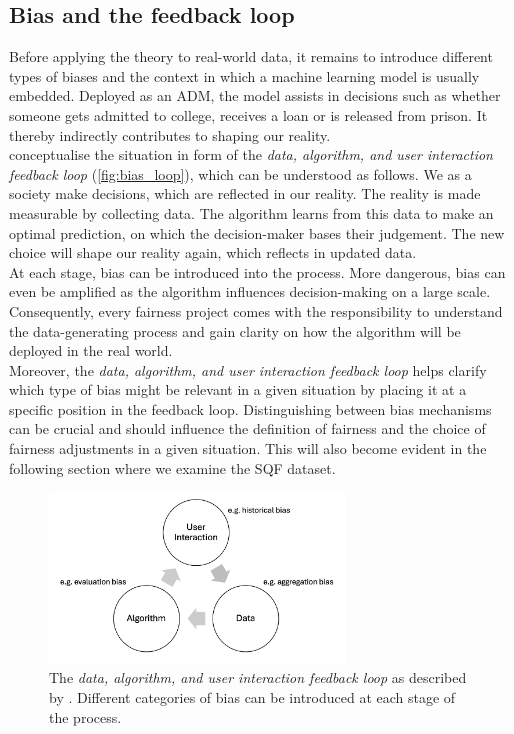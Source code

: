 \subsection{Bias and the feedback loop}
Before applying the theory to real-world data, it remains to introduce different types of biases and the context in which a machine learning model is usually embedded.
Deployed as an ADM, the model assists in decisions such as whether someone gets admitted to college, receives a loan or is released from prison. It thereby indirectly contributes to shaping our reality.\\
\cite{mehrabi2022} conceptualise the situation in form of the \textit{data, algorithm, and user interaction feedback loop} (\autoref{fig:bias_loop}), which can be understood as follows.
We as a society make decisions, which are reflected in our reality. The reality is made measurable by collecting data. The algorithm learns from this data to make an optimal prediction, on which the decision-maker bases their judgement. The new choice will shape our reality again, which reflects in updated data.\\ 
At each stage, bias can be introduced into the process. More dangerous, bias can even be amplified as the algorithm influences decision-making on a large scale.
Consequently, every fairness project comes with the responsibility to understand the data-generating process and gain clarity on how the algorithm will be deployed in the real world.\\
Moreover, the \textit{data, algorithm, and user interaction feedback loop} helps clarify which type of bias might be relevant in a given situation by placing it at a specific position in the feedback loop. Distinguishing between bias mechanisms can be crucial and should influence the definition of fairness and the choice of fairness adjustments in a given situation. This will also become evident in the following section where we examine the SQF dataset.

\begin{figure}
    \centering
    \includegraphics[width=0.7\textwidth]{../figures/bias_loop.png}
    \caption{The \textit{data, algorithm, and user interaction feedback loop} as described by \cite{mehrabi2022}. Different categories of bias can be introduced at each stage of the process.}
    \label{fig:bias_loop}
\end{figure}

